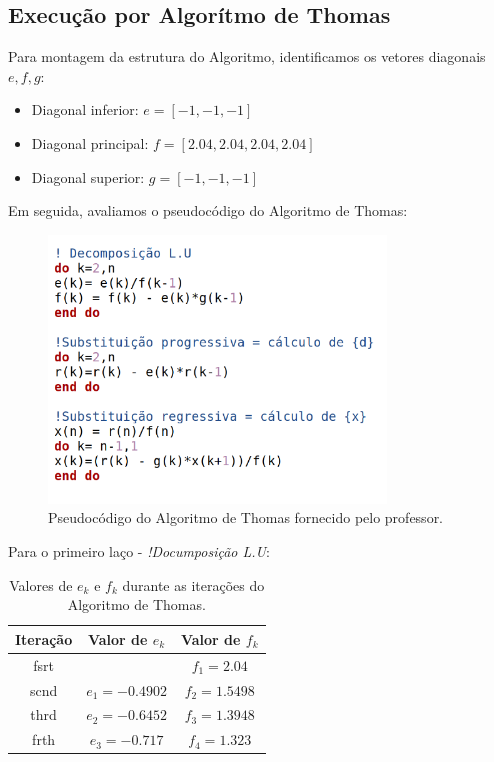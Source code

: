 \documentclass[12pt]{article}
\begin{document}
\subsection{Execução por Algorítmo de Thomas}

Para montagem da estrutura do Algoritmo, identificamos os vetores diagonais \(e, f, g\):

\begin{itemize}
    \item Diagonal inferior: $e = [-1, -1, -1]$
    \item Diagonal principal: $f = [2.04, 2.04, 2.04, 2.04]$
    \item Diagonal superior: $g = [-1, -1, -1]$
\end{itemize}

\newpage
Em seguida, avaliamos o pseudocódigo do Algoritmo de Thomas:

\begin{figure}[H]
\centering
\includegraphics[width=0.8\textwidth]{img/algoritmo_thomas.png}
\caption{Pseudocódigo do Algoritmo de Thomas fornecido pelo professor.}
\end{figure}

Para o primeiro laço - \textit{!Documposição L.U}:

\begin{table}[H]
\centering
\begin{tabular}{|c|c|c|}
\hline
\textbf{Iteração} & \textbf{Valor de $e_k$} & \textbf{Valor de $f_k$} \\
\hline
fsrt &  & $f_1 = 2.04$ \\
scnd & $e_1 = -0.4902$ & $f_2 = 1.5498$ \\
thrd & $e_2 = -0.6452$ & $f_3 = 1.3948$ \\
frth & $e_3 = -0.717$ & $f_4 = 1.323$ \\
\hline
\end{tabular}
\caption{Valores de $e_k$ e $f_k$ durante as iterações do Algoritmo de Thomas.}
\label{tab:thomas_iterations}
\end{table}
\end{document}
